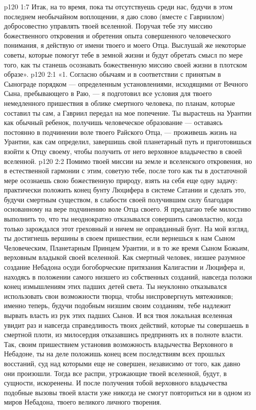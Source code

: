 \vs p120 1:7 Итак, на то время, пока ты отсутствуешь среди нас, будучи в этом последнем необычайном воплощении, я даю слово (вместе с Гавриилом) добросовестно управлять твоей вселенной. Поручая тебе эту миссию божественного откровения и обретения опыта совершенного человеческого понимания, я действую от имени твоего и моего Отца. Выслушай же некоторые советы, которые помогут тебе в земной жизни и будут обретать смысл по мере того, как ты станешь осознавать божественную миссию своей жизни в плотском образе».
\vs p120 2:1 «1. Согласно обычаям и в соответствии с принятым в Сынограде порядком --- определенным установлениями, исходящими от Вечного Сына, пребывающего в Раю, --- я подготовил все условия для твоего немедленного пришествия в облике смертного человека, по планам, которые составил ты сам, а Гавриил передал на мое попечение. Ты вырастешь на Урантии как обычный ребенок, получишь человеческое образование --- оставаясь постоянно в подчинении воле твоего Райского Отца, --- проживешь жизнь на Урантии, как сам определил, завершишь свой планетарный путь и приготовишься взойти к Отцу своему, чтобы получить от него верховное владычество в своей вселенной.
\vs p120 2:2 \bibnobreakspace Помимо твоей миссии на земле и вселенского откровения, но в естественной гармонии с этим, советую тебе, после того как ты в достаточной мере осознаешь свою божественную природу, взять на себя еще одну задачу: практически положить конец бунту Люцифера в системе Сатании и сделать это, будучи  смертным существом, в слабости своей получившим силу благодаря основанному на вере подчинению воле Отца своего. Я предлагаю тебе милостиво выполнить то, что ты неоднократно отказывался совершить самовластно, когда только зарождался этот греховный и ничем не оправданный бунт. На мой взгляд, ты достигнешь вершины в своем пришествии, если вернешься к нам Сыном Человеческим, Планетарным Принцем Урантии, и в то же время Сыном Божьим, верховным владыкой своей вселенной. Как смертный человек, низшее разумное создание Небадона осуди богоборческие притязания Калигастии и Люцифера и, находясь в положении самого низшего из собственных созданий, навсегда положи конец измышлениям этих падших детей света. Ты неуклонно отказывался использовать свои возможности творца, чтобы ниспровергнуть мятежников; именно теперь, будучи подобным низшим своим созданиям, тебе надлежит вырвать власть из рук этих падших Сынов. И вся твоя локальная вселенная увидит раз и навсегда справедливость твоих действий, которые ты совершаешь в смертной плоти, из милосердия отказавшись предпринять их в полноте власти. Так, своим пришествием установив возможность владычества Верховного в Небадоне, ты на деле положишь конец всем последствиям всех прошлых восстаний, суд над которыми еще не совершен, независимо от того, как давно они произошли. Тогда все распри, угрожающие твоей вселенной, будут, в сущности, искоренены. И после получения тобой верховного владычества подобные вызовы твоей власти уже никогда не смогут повториться ни в одном из миров Небадона, твоего великого личного творения.
